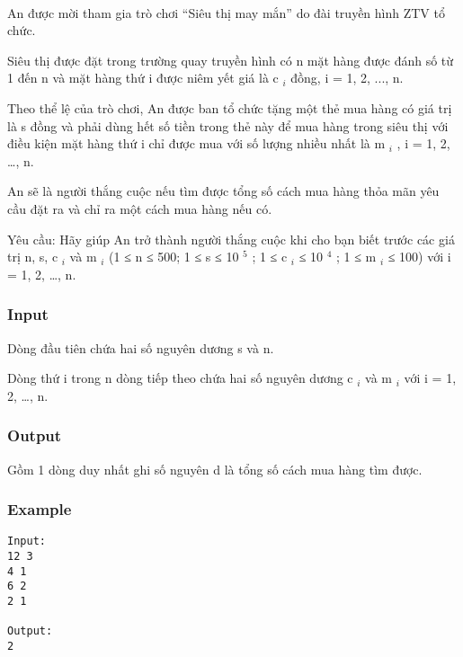 

 

An được mời tham gia trò chơi “Siêu thị may mắn” do đài truyền hình ZTV tổ chức.

Siêu thị được đặt trong trường quay truyền hình có n mặt hàng được đánh số từ 1 đến n và mặt hàng thứ i được niêm yết giá là c $_ i $ đồng, i = 1, 2, ..., n.

Theo thể lệ của trò chơi, An được ban tổ chức tặng một thẻ mua hàng có giá trị là s đồng và phải dùng hết số tiền trong thẻ này để mua hàng trong siêu thị với điều kiện mặt hàng thứ i chỉ được mua với số lượng nhiều nhất là m $_ i $ , i = 1, 2, …, n.

An sẽ là người thắng cuộc nếu tìm được tổng số cách mua hàng thỏa mãn yêu cầu đặt ra và chỉ ra một cách mua hàng nếu có.

Yêu cầu: Hãy giúp An trở thành người thắng cuộc khi cho bạn biết trước các giá trị n, s, c $_ i $ và m $_ i $ (1 ≤ n ≤ 500; 1 ≤ s ≤ 10 $^ 5 $ ; 1 ≤ c $_ i $ ≤ 10 $^ 4 $ ; 1 ≤ m $_ i $ ≤ 100) với i = 1, 2, …, n.

\subsubsection{Input}

Dòng đầu tiên chứa hai số nguyên dương s và n.

Dòng thứ i trong n dòng tiếp theo chứa hai số nguyên dương c $_ i $ và m $_ i $ với i = 1, 2, …, n.

\subsubsection{Output}

Gồm 1 dòng duy nhất ghi số nguyên d là tổng số cách mua hàng tìm được.

\subsubsection{Example}
\begin{verbatim}
Input:
12 3
4 1
6 2
2 1

Output:
2
\end{verbatim}